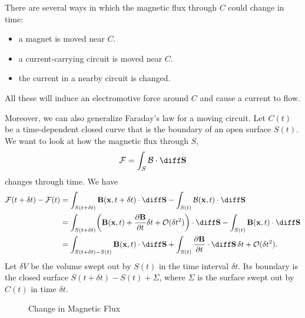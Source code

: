 \documentclass[12pt]{article}
\begin{document}
There are several ways in which the magnetic flux through $C$ could change in time:
\begin{itemize}
	\item a magnet is moved near $C$.
	\item a current-carrying circuit is moved near $C$.
	\item the current in a nearby circuit is changed.
\end{itemize}

All these will induce an electromotive force around $C$ and cause a current to flow.

Moreover, we can also generalize Faraday's law for a moving circuit. Let $C(t)$ be a time-dependent closed curve that is the boundary of an open surface $S(t)$. We want to look at how the magnetic flux through $S$,
\[
\mathcal{F} = \int_{S} \mathcal{B} \cdot \diff \mathbf{S}
\]
changes through time. We have
\begin{align*}
	\mathcal{F}(t + \delta t) - \mathcal{F}(t) &= \int_{S(t+\delta t)}\mathbf{B}(\mathbf{x}, t + \delta t) \cdot \diff \mathbf{S} - \int_{S(t)} \mathcal{B}(\mathbf{x}, t) \cdot \diff \mathbf{S} \\
						   &= \int_{S(t+\delta t)} \biggl( \mathbf{B}(\mathbf{x}, t) + \frac{\partial \mathbf{B}}{\partial t} \delta t + \mathcal{O}(\delta t^2) \biggr) \cdot \diff \mathbf{S} - \int_{S(t)} \mathbf{B}(\mathbf{x}, t) \cdot \diff \mathbf{S} \\
						   &= \int_{S(t+\delta t) - S(t)} \mathbf{B}(\mathbf{x}, t) \cdot \diff \mathbf{S} + \int_{S(t)} \frac{\partial \mathbf{B}}{\partial t} \cdot \diff \mathbf{S}\, \delta t + \mathcal{O}(\delta t^2).
\end{align*}
Let $\delta V$ be the volume swept out by $S(t)$ in the time interval $\delta t$. Its boundary is the closed surface $S(t+\delta t) - S(t) + \Sigma$, where $\Sigma$ is the surface swept out by $C(t)$ in time $\delta t$.

\begin{figure}[h]
	\centering
	\caption{Change in Magnetic Flux}
	\label{fig:change_in_mf}
\end{figure}
\end{document}
